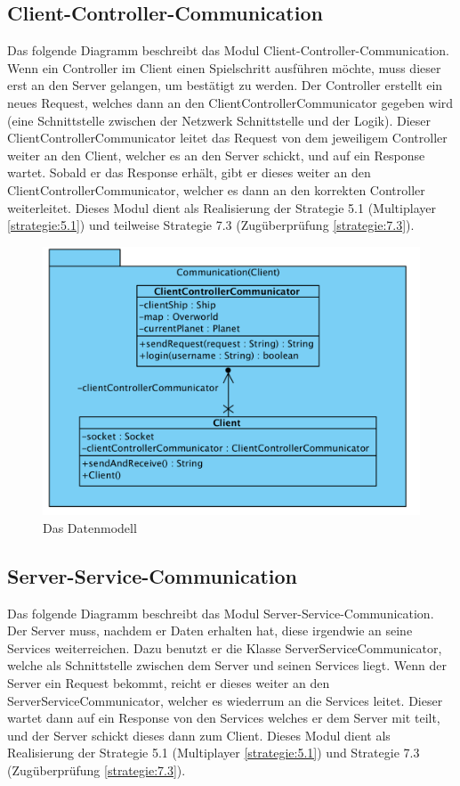 \documentclass[fontsize=12pt,paper=a4,twoside]{scrartcl}
\begin{document}
\subsection{Client-Controller-Communication}
Das folgende Diagramm beschreibt das Modul Client-Controller-Communication. Wenn ein Controller im Client einen Spielschritt ausführen möchte, muss dieser erst an den Server gelangen, um bestätigt zu werden. Der Controller erstellt ein neues Request, welches dann an den ClientControllerCommunicator gegeben wird (eine Schnittstelle zwischen der Netzwerk Schnittstelle und der Logik). Dieser ClientControllerCommunicator leitet das Request von dem jeweiligem Controller weiter an den Client, welcher es an den Server schickt, und auf ein Response wartet. Sobald er das Response erhält, gibt er dieses weiter an den ClientControllerCommunicator, welcher es dann an den korrekten Controller weiterleitet.
Dieses Modul dient als Realisierung der Strategie 5.1 (Multiplayer \ref{strategie:5.1}) und teilweise Strategie 7.3 (Zugüberprüfung \ref{strategie:7.3}).
\begin{figure}[H]
\begin{center}
  \includegraphics[width=\linewidth]{../GT_Modulsicht/src/CommClient.png}
    \caption{Das Datenmodell}
\end{center}
\end{figure}

\subsection{Server-Service-Communication}

Das folgende Diagramm beschreibt das Modul Server-Service-Communication. Der Server muss, nachdem er Daten erhalten hat, diese irgendwie an seine Services weiterreichen. Dazu benutzt er die Klasse ServerServiceCommunicator, welche als Schnittstelle zwischen dem Server und seinen Services liegt. Wenn der Server ein Request bekommt, reicht er dieses weiter an den ServerServiceCommunicator, welcher es wiederrum an die Services leitet. Dieser wartet dann auf ein Response von den Services welches er dem Server mit teilt, und der Server schickt dieses dann zum Client.
Dieses Modul dient als Realisierung der Strategie 5.1 (Multiplayer \ref{strategie:5.1}) und Strategie 7.3 (Zugüberprüfung \ref{strategie:7.3}).
\end{document}
